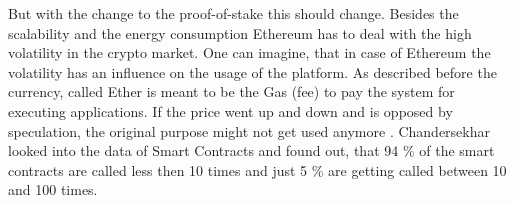 But with the change to the proof-of-stake this should change.
Besides the scalability and the energy consumption Ethereum has to deal with the high volatility in the crypto market. 
One can imagine, that in case of Ethereum the volatility has an influence on the usage of the platform. 
As described before the currency, called Ether is meant to be the Gas (fee) to pay the system for executing applications. 
If the price went up and down and is opposed by speculation, the original purpose might not get used anymore \cite{Chandersekhar2018}. 
Chandersekhar looked into the data of Smart Contracts and found out, that 94 \% of the smart contracts are called less then 10 times and just 5 \% are getting called between 10 and 100 times. 
